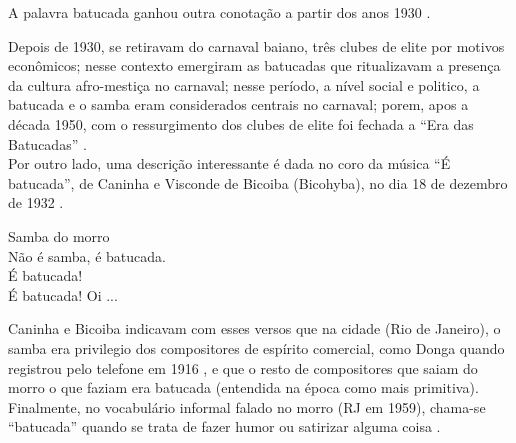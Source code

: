 \begin{description}
A palavra batucada ganhou outra conotação a partir dos anos 1930 \cite[pp. 103]{sandroni2001feitico}.

Depois de 1930, se retiravam do carnaval baiano, três clubes de elite por motivos econômicos; 
nesse contexto emergiram as batucadas que ritualizavam a presença da cultura afro-mestiça no carnaval; 
nesse período, a nível social e politico, a batucada e o samba eram considerados centrais no carnaval; 
porem, apos a década 1950, com o ressurgimento dos clubes de elite foi fechada a ``Era das Batucadas'' \cite{ICKES2013}.\\



Por outro lado, uma descrição interessante é dada no coro da música ``É batucada'', 
de Caninha e Visconde de Bicoiba (Bicohyba), no dia 18 de dezembro de 1932 \cite[pp. 12]{refebatucadajornal}.
\begin{citando}
Samba do morro\\
Não é samba, é batucada.\\
É batucada!\\
É batucada! Oi ...\\
\end{citando}
Caninha e Bicoiba indicavam com esses versos que na cidade (Rio de Janeiro),
o samba era privilegio dos compositores de espírito comercial, 
como Donga quando registrou pelo telefone em 1916 \cite[Cad. B pp. 4]{jornalsambaderoda5},
e que o resto de compositores que saiam do morro o que faziam era batucada 
(entendida na época como mais primitiva).\\




Finalmente, no vocabulário informal falado no morro (RJ em 1959), 
chama-se  ``batucada''
quando se trata de fazer humor ou satirizar alguma coisa \cite[pp. 32]{jornalsambaderoda2}.
\end{description}



